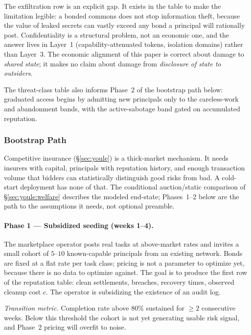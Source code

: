 \documentclass[11pt,a4paper]{article}
\theoremstyle{definition}
\theoremstyle{remark}
\begin{document}
The exfiltration row is an explicit gap. It exists in the table to make the limitation legible: a bonded commons does not stop information theft, because the value of leaked secrets can vastly exceed any bond a principal will rationally post. Confidentiality is a structural problem, not an economic one, and the answer lives in Layer~1 (capability-attenuated tokens, isolation domains) rather than Layer~3. The economic alignment of this paper is correct about damage to \emph{shared state}; it makes no claim about damage from \emph{disclosure of state to outsiders}.

The threat-class table also informs Phase~2 of the bootstrap path below: graduated access begins by admitting new principals only to the careless-work and abandonment bands, with the active-sabotage band gated on accumulated reputation.

\subsubsection{Bootstrap Path}\label{sec:pricing:bootstrap}

Competitive insurance (\S\ref{sec:youle}) is a thick-market mechanism. It needs insurers with capital, principals with reputation history, and enough transaction volume that bidders can statistically distinguish good risks from bad. A cold-start deployment has none of that. The conditional auction/static comparison of \S\ref{sec:youle:welfare} describes the modeled end-state; Phases~1--2 below are the path to the assumptions it needs, not optional preamble.

\paragraph{Phase 1 --- Subsidized seeding (weeks 1--4).}
The marketplace operator posts real tasks at above-market rates and invites a small cohort of $5$--$10$ known-capable principals from an existing network. Bonds are fixed at a flat rate per task class; pricing is not a parameter to optimize yet, because there is no data to optimize against. The goal is to produce the first row of the reputation table: clean settlements, breaches, recovery times, observed cleanup cost $c$. The operator is subsidizing the existence of an audit log.

\emph{Transition metric.} Completion rate above $80\%$ sustained for $\geq 2$ consecutive weeks. Below this threshold the cohort is not yet generating usable risk signal, and Phase~2 pricing will overfit to noise.
\end{document}
